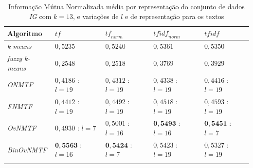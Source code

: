 \documentclass[
    12pt,                %
    oneside,            %
    a4paper,            %
    english,            %
    brazil                %
    ]{abntex2ppgsi}
\begin{document}
\begin{table}[H]
\centering
    \caption{Informação Mútua Normalizada média por representação do conjunto de dados \textit{IG} com $k = 13$, e variações de $l$ e de representação para os textos}
    \begin{tabular}{lllll}
        \hline
        \textbf{Algoritmo} & $\textit{tf}$ & $\textit{tf}_{norm}$ & $\textit{tfidf}_{norm}$ & $\textit{tfidf}$ \\
        \hline
        \textit{k-means}       & $0,5235$            & $0,5240$            & $0,5361$            & $0,5350$ \\
        \textit{fuzzy k-means} & $0,2548$            & $0,2518$            & $0,3769$            & $0,3929$ \\
        \textit{ONMTF}         & $0,4186$ : $l = 19$ & $0,4312$ : $l = 19$ & $0,4338$ : $l = 19$ & $0,4416$ : $l = 19$ \\
        \textit{FNMTF}         & $0,4412$ : $l = 19$ & $0,4492$ : $l = 19$ & $0,4518$ : $l = 19$ & $0,4593$ : $l = 19$ \\
        \textit{OvNMTF}        & $0,4930$ : $l = 7$  & $0,5001$ : $l = 16$ & $\mathbf{0,5493}$ : $l = 16$ & $\mathbf{0,5451}$ : $l = 7$ \\
        \textit{BinOvNMTF}     & $\mathbf{0,5563}$ : $l = 16$ & $\mathbf{0,5424}$ : $l = 7$  & $0,5423$ : $l = 19$ & $0,5327$ : $l = 19$ \\
        \hline \\
    \end{tabular}
    \label{tab:experiments-quant-nmi:ig}
\end{table}
\end{document}
